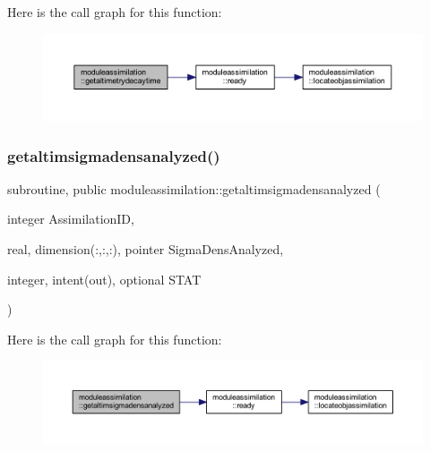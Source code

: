 Here is the call graph for this function\+:\nopagebreak
\begin{figure}[H]
\begin{center}
\leavevmode
\includegraphics[width=350pt]{namespacemoduleassimilation_aaab7e59362629aa1c11d99a2b3b6ad30_cgraph}
\end{center}
\end{figure}
\mbox{\label{namespacemoduleassimilation_a49834c1e597575cf155649b2bfe4321b}} 
\subsubsection{\texorpdfstring{getaltimsigmadensanalyzed()}{getaltimsigmadensanalyzed()}}
{\footnotesize\ttfamily subroutine, public moduleassimilation\+::getaltimsigmadensanalyzed (\begin{DoxyParamCaption}\item[{integer}]{Assimilation\+ID,  }\item[{real, dimension(\+:,\+:,\+:), pointer}]{Sigma\+Dens\+Analyzed,  }\item[{integer, intent(out), optional}]{S\+T\+AT }\end{DoxyParamCaption})}

Here is the call graph for this function\+:\nopagebreak
\begin{figure}[H]
\begin{center}
\leavevmode
\includegraphics[width=350pt]{namespacemoduleassimilation_a49834c1e597575cf155649b2bfe4321b_cgraph}
\end{center}
\end{figure}
\mbox{\label{namespacemoduleassimilation_ae8923d911da53170ca8bc79256ecfaee}} 
